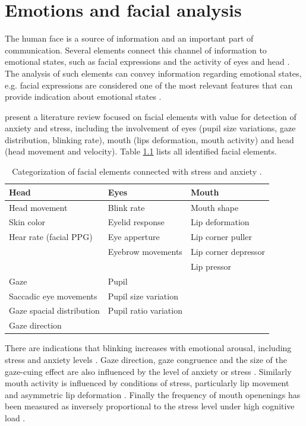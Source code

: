 \chapter{Emotions and facial analysis}

The human face is a source of information and an important part of communication. Several elements connect this channel of information to emotional states, such as facial expressions and the activity of eyes and head \parencite{akakin2010spatiotemporal}. The analysis of such elements can convey information regarding emotional states, e.g. facial expressions are considered one of the most relevant features that can provide indication about emotional states \parencite{cowie2001emotion}.

\textcite{giannakakis2017stress} present a literature review focused on facial elements with value for detection of anxiety and stress, including the involvement of eyes (pupil size variations, gaze distribution, blinking rate), mouth (lips deformation, mouth activity) and head (head movement and velocity). Table \ref{table:stress-facial-features} lists all identified facial elements.

\begin{table}[h]
\begin{tabular}{lll}%
\toprule%
Head & Eyes & Mouth \\
\midrule
Head movement & Blink rate & Mouth shape \\
Skin color & Eyelid response & Lip deformation  \\
Hear rate (facial PPG) & Eye apperture & Lip corner puller \\
& Eyebrow movements & Lip corner depressor \\
& & Lip pressor \\
\midrule
Gaze & Pupil & \\
\midrule
Saccadic eye movements & Pupil size variation &  \\
Gaze spacial distribution & Pupil ratio variation &  \\
Gaze direction & &\\
\bottomrule%
\end{tabular}%
\caption{Categorization of facial elements connected with stress and anxiety \parencite{giannakakis2017stress}.}
\label{table:stress-facial-features}
\end{table}

There are indications that blinking increases with emotional arousal, including stress and anxiety levels \parencite{dinges2005optical}. Gaze direction, gaze congruence and the size of the gaze-cuing effect are also influenced by the level of anxiety or stress \parencite{staab2014influence}. Similarly mouth activity is influenced by conditions of stress, particularly lip movement \parencite{dinges2005optical} and asymmetric lip deformation \parencite{metaxas2004image}. Finally the frequency of mouth openenings has been measured as inversely proportional to the stress level under high cognitive load \parencite{liao2005decision}.

